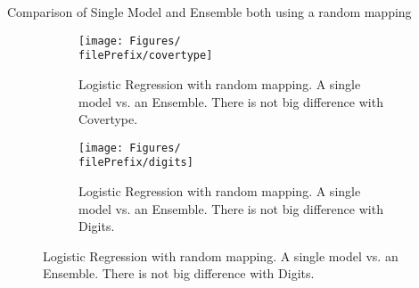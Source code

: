 %
%
%


{\LARGE Comparison of Single Model and Ensemble both using a random mapping}

\renewcommand{\filePrefix}{\undPrefix/aux}
\begin{figure}[H]
  \centering
  \begin{subfigure}[t]{0.5\linewidth}
    \centering\captionsetup{width=.8\linewidth}\texttt{[image: Figures/\\filePrefix/covertype]}
    \caption{Logistic Regression with random mapping. A single model vs. an Ensemble. There is not big difference with Covertype.}
    \label{2_2:aux}
  \end{subfigure}%
  \begin{subfigure}[t]{0.5\linewidth}
    \centering\captionsetup{width=.8\linewidth}\texttt{[image: Figures/\\filePrefix/digits]}
    \caption{Logistic Regression with random mapping. A single model vs. an Ensemble. There is not big difference with Digits.}
    \label{fig:\undPrefix_digits}
  \end{subfigure}
\end{figure}


